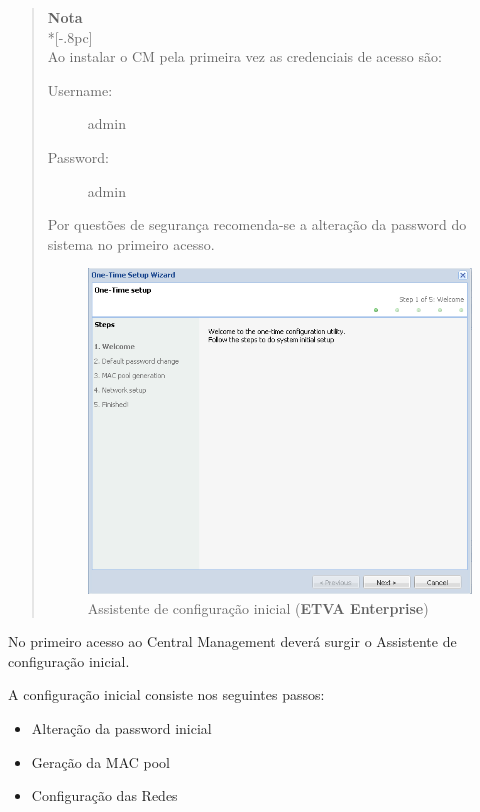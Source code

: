 \begin{quote}
	{\large \bf Nota} \\*[-.8pc]
	\underline{\hspace{6in}} \\
	Ao instalar o CM pela primeira vez as credenciais de acesso são:
	\begin{description}
        	\item[Username:] admin
	        \item[Password:] admin
	\end{description}
	Por questões de segurança recomenda-se a alteração da password do sistema no primeiro acesso.

\begin{figure}[H]
        \begin{center}
        \includegraphics[scale=0.7]{screenshots/first_time_wizard.png}
        \caption{Assistente de configuração inicial ({\bf ETVA Enterprise})}
        \label{fig:first_time_wizard}
        \end{center}
\end{figure}

\end{quote}

No primeiro acesso ao Central Management deverá surgir o Assistente de configuração inicial.

A configuração inicial consiste nos seguintes passos:
\begin{itemize}
	\item Alteração da password inicial
	\item Geração da MAC pool	
	\item Configuração das Redes
\end{itemize}

